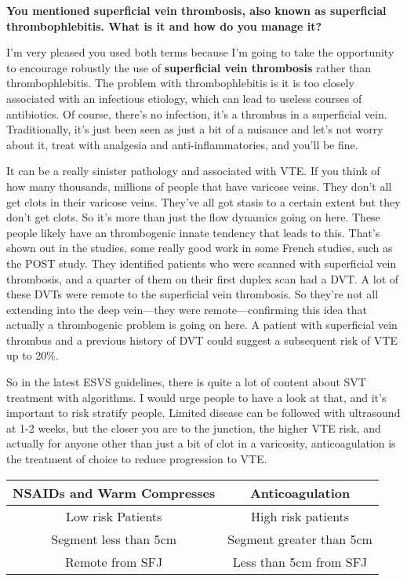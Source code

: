\documentclass[
]{book}
\begin{document}
\textbf{You mentioned superficial vein thrombosis, also known as superficial
thrombophlebitis. What is it and how do you manage it?}

I'm very pleased you used both terms because I'm going to take the
opportunity to encourage robustly the use of \textbf{superficial vein
thrombosis} rather than thrombophlebitis. The problem with
thrombophlebitis is it is too closely associated with an infectious
etiology, which can lead to useless courses of antibiotics. Of course,
there's no infection, it's a thrombus in a superficial vein.
Traditionally, it's just been seen as just a bit of a nuisance and let's
not worry about it, treat with analgesia and anti-inflammatories, and
you'll be fine.

It can be a really sinister pathology and associated with VTE. If you
think of how many thousands, millions of people that have varicose
veins. They don't all get clots in their varicose veins. They've all got
stasis to a certain extent but they don't get clots. So it's more than
just the flow dynamics going on here. These people likely have an
thrombogenic innate tendency that leads to this. That's shown out in the
studies, some really good work in some French studies, such as the POST
study. They identified patients who were scanned with superficial vein
thrombosis, and a quarter of them on their first duplex scan had a DVT.
A lot of these DVTs were remote to the superficial vein
thrombosis.\citep{decousus2010} So they're not all extending into the deep
vein---they were remote---confirming this idea that actually a
thrombogenic problem is going on here. A patient with superficial vein
thrombus and a previous history of DVT could suggest a subsequent risk
of VTE up to 20\%.

So in the latest ESVS guidelines, there is quite a lot of content about
SVT treatment with algorithms. I would urge people to have a look at
that, and it's important to risk stratify people. Limited disease can be
followed with ultrasound at 1-2 weeks, but the closer you are to the
junction, the higher VTE risk, and actually for anyone other than just a
bit of clot in a varicosity, anticoagulation is the treatment of choice
to reduce progression to VTE.\citep{kakkos2021, dinisio2018, scovell2018}

\begin{longtable}[]{@{}cc@{}}
\toprule()
NSAIDs and Warm Compresses & Anticoagulation \\
\midrule()
\endhead
Low risk Patients & High risk patients \\
Segment less than 5cm & Segment greater than 5cm \\
Remote from SFJ & Less than 5cm from SFJ \\
\bottomrule()
\end{longtable}
\end{document}
